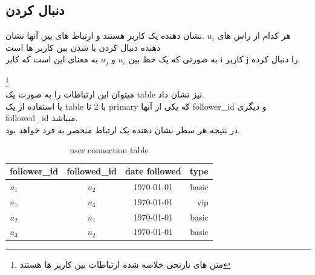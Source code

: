 \documentclass[12pt]{article}
\begin{document}
\subsection{دنبال کردن}
هر کدام از راس های $u_i$ .نشان دهنده یک کاربر هستند و ارتباط های بین آنها نشان دهنده دنبال کردن یا شدن بین کاربر ها است\\
به صورتی که یک خط بین $u_i$ و $u_j$ به معنای این است که کابر i کاربر j را دنبال کرده.
\vspace{0.5cm}
\begin{latin}
\end{latin}
\footnote{متن های نارنحی خلاصه شده ارتباطات بین کاربر ها هستند}\\
میتوان این ارتباطات را به صورت یک table نیز نشان داد.\\
با استفاده از یک table با 2 تا primary
که یکی از آنها follower\_id و دیگری followed\_id میباشد.\\
در نتیجه هر سطر نشان دهنده یک ارتباط منحصر به فرد خواهد بود.
\begin{latin}
    \begin{table}[h]
        \centering
        \begin{tabular}{|l|c|c|r|}
            \hline
            follower\_id & followed\_id & date followed & type  \\
            \hline
            $u_1$        & $u_2$        & \today        & basic \\
            $u_1$        & $u_3$        & \today        & vip   \\
            $u_2$        & $u_1$        & \today        & basic \\
            $u_3$        & $u_2$        & \today        & basic \\
            \hline
        \end{tabular}
        \caption{user connection table}
    \end{table}
\end{latin}
\end{document}
